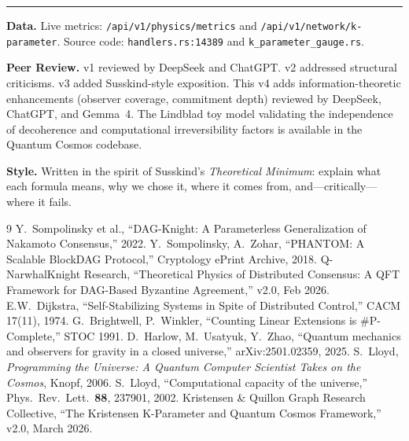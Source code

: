 \documentclass[11pt,a4paper]{article}
\begin{document}
\vspace{0.5cm}
\hrule
\vspace{0.3cm}
{\small\textbf{Data.} Live metrics: \texttt{/api/v1/physics/metrics} and \texttt{/api/v1/network/k-parameter}. Source code: \texttt{handlers.rs:14389} and \texttt{k\_parameter\_gauge.rs}.}

\vspace{0.2cm}
{\small\textbf{Peer Review.} v1 reviewed by DeepSeek and ChatGPT. v2 addressed structural criticisms. v3 added Susskind-style exposition. This v4 adds information-theoretic enhancements (observer coverage, commitment depth) reviewed by DeepSeek, ChatGPT, and Gemma~4. The Lindblad toy model validating the independence of decoherence and computational irreversibility factors is available in the Quantum Cosmos codebase.}

\vspace{0.2cm}
{\small\textbf{Style.} Written in the spirit of Susskind's \emph{Theoretical Minimum}: explain what each formula means, why we chose it, where it comes from, and---critically---where it fails.}

\begin{thebibliography}{9}
\small
{} Y.~Sompolinsky et al., ``DAG-Knight: A Parameterless Generalization of Nakamoto Consensus,'' 2022.
 Y.~Sompolinsky, A.~Zohar, ``PHANTOM: A Scalable BlockDAG Protocol,'' Cryptology ePrint Archive, 2018.
 Q-NarwhalKnight Research, ``Theoretical Physics of Distributed Consensus: A QFT Framework for DAG-Based Byzantine Agreement,'' v2.0, Feb 2026.
 E.W.~Dijkstra, ``Self-Stabilizing Systems in Spite of Distributed Control,'' CACM 17(11), 1974.
 G.~Brightwell, P.~Winkler, ``Counting Linear Extensions is \#P-Complete,'' STOC 1991.
 D.~Harlow, M.~Usatyuk, Y.~Zhao, ``Quantum mechanics and observers for gravity in a closed universe,'' arXiv:2501.02359, 2025.
 S.~Lloyd, \emph{Programming the Universe: A Quantum Computer Scientist Takes on the Cosmos}, Knopf, 2006.
 S.~Lloyd, ``Computational capacity of the universe,'' Phys.\ Rev.\ Lett.\ \textbf{88}, 237901, 2002.
 Kristensen \& Quillon Graph Research Collective, ``The Kristensen K-Parameter and Quantum Cosmos Framework,'' v2.0, March 2026.
\end{thebibliography}
\end{document}
